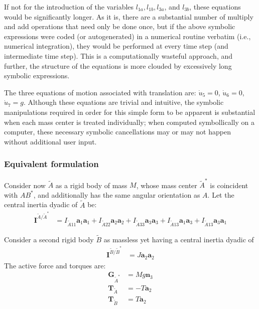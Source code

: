 \documentclass[letterpaper,11pt]{article}
\newcommand{\bs}[1]{ \boldsymbol{ #1 } }
\begin{document}
If not for the introduction of the variables $l_{1a}, l_{1b}, l_{3a}$, and
$l_{3b}$, these equations would be significantly longer. As it is, there are a
substantial number of multiply and add operations that need only be done once,
but if the above symbolic expressions were coded (or autogenerated) in a
numerical routine verbatim (i.e., numerical integration), they would be
performed at every time step (and intermediate time step).  This is a
computationally wasteful approach, and further, the structure of the equations
is more clouded by excessively long symbolic expressions.

The three equations of motion associated with translation are:
$\dot{u}_5 = 0$, $\dot{u}_6 = 0$, $\dot{u}_7 = g$.  Although these equations
are trivial and intuitive, the symbolic manipulations required in order for
this simple form to be apparent is substantial when each mass center is treated
individually; when computed symbollically on a computer, these necessary
symbolic cancellations may or may not happen without additional user input.

\subsubsection*{Equivalent formulation}
Consider now $\tilde{A}$ as a rigid body of mass $M$, whose mass center
$\tilde{A}^*$ is coincident with $AB^*$, and additionally has the same angular
orientation as $A$. Let the central inertia dyadic of $\tilde{A}$ be:
\begin{align*}
  \bs{I}^{\tilde{A}/\tilde{A}^*} & = I_{\tilde{A}11}\bs{a}_1\bs{a}_1 + I_{\tilde{A}22}\bs{a}_2\bs{a}_2 +
  I_{\tilde{A}33}\bs{a}_3\bs{a}_3 + I_{\tilde{A}13}\bs{a}_1\bs{a}_3 + I_{\tilde{A}13}\bs{a}_3\bs{a}_1
\end{align*}

Consider a second rigid body $\tilde{B}$ as massless yet having a central inertia
dyadic of
\begin{align*}
  \bs{I}^{\tilde{B}/\tilde{B}^*} & = J\bs{a}_2\bs{a}_2
\end{align*}
The active force and torques are:
\begin{align*}
  \bs{G}_{\tilde{A}^*} & = Mg\bs{n}_3 \\
  \bs{T}_{\tilde{A}} & = - T \bs{a}_2 \\
  \bs{T}_{\tilde{B}} & = T \bs{a}_2
\end{align*}
\end{document}
